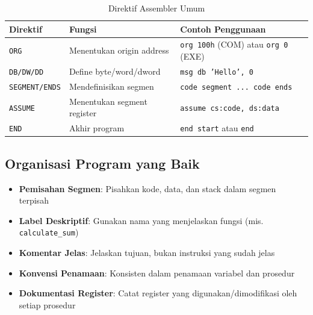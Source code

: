 \begin{table}[h]
\centering
\caption{Direktif Assembler Umum}
\begin{tabular}{|p{3cm}|p{4cm}|p{8cm}|}
\hline
\textbf{Direktif} & \textbf{Fungsi} & \textbf{Contoh Penggunaan} \\
\hline
\texttt{ORG} & Menentukan origin address & \texttt{org 100h} (COM) atau \texttt{org 0} (EXE) \\
\hline
\texttt{DB/DW/DD} & Define byte/word/dword & \texttt{msg db 'Hello', 0} \\
\hline
\texttt{SEGMENT/ENDS} & Mendefinisikan segmen & \texttt{code segment ... code ends} \\
\hline
\texttt{ASSUME} & Menentukan segment register & \texttt{assume cs:code, ds:data} \\
\hline
\texttt{END} & Akhir program & \texttt{end start} atau \texttt{end} \\
\hline
\end{tabular}
\label{tab:assembly-directives}
\end{table}

\subsection{Organisasi Program yang Baik}
\begin{itemize}
    \item \textbf{Pemisahan Segmen}: Pisahkan kode, data, dan stack dalam segmen terpisah
    \item \textbf{Label Deskriptif}: Gunakan nama yang menjelaskan fungsi (mis. \texttt{calculate\_sum})
    \item \textbf{Komentar Jelas}: Jelaskan tujuan, bukan instruksi yang sudah jelas
    \item \textbf{Konvensi Penamaan}: Konsisten dalam penamaan variabel dan prosedur
    \item \textbf{Dokumentasi Register}: Catat register yang digunakan/dimodifikasi oleh setiap prosedur
\end{itemize}

